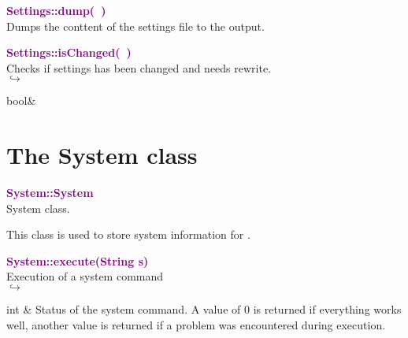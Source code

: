 
\textcolor{purple}{\textbf{Settings::dump(~)}}\label{Settings::dump()}\\
Dumps the conttent of the settings file to the output.


\textcolor{purple}{\textbf{Settings::isChanged(~)}}\label{Settings::isChanged()}\\
Checks if settings has been changed and needs rewrite.\\ \hspace*{5mm}$\hookrightarrow$
\vspace*{-2em}\begin{tcolorbox}[grow to left by=-1cm, width=\textwidth-1cm,myArgs,tabularx={l|R}]
bool&
\end{tcolorbox}


\section{The System class}

\textcolor{purple}{\textbf{System::System}}\label{System::System}\\
System class.

This class is used to store system information for \DynELA.

\textcolor{purple}{\textbf{System::execute(String s)}}\label{System::execute(String s)}\\
Execution of a system command\\ \hspace*{5mm}$\hookrightarrow$
\vspace*{-2em}\begin{tcolorbox}[grow to left by=-1cm, width=\textwidth-1cm,myArgs,tabularx={l|R}]
int & Status of the system command. A value of 0 is returned if everything works well, another value is returned if a problem was encountered during execution.
\end{tcolorbox}

